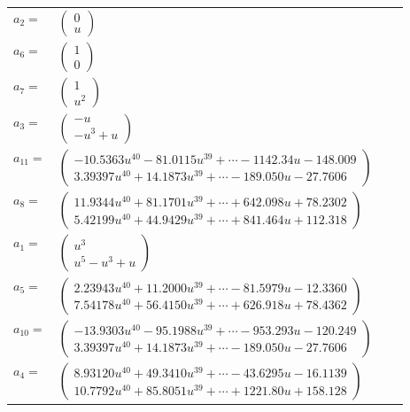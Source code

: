 \documentclass[1p]{elsarticle_modified}
\theoremstyle{definition}
\begin{document}
\begin{tabular}{m{7pt} m{180pt} m{7pt} m{180pt} }
\flushright $a_{2}=$&$\begin{pmatrix}0\\u\end{pmatrix}$ \\
\flushright $a_{6}=$&$\begin{pmatrix}1\\0\end{pmatrix}$ \\
\flushright $a_{7}=$&$\begin{pmatrix}1\\u^2\end{pmatrix}$ \\
\flushright $a_{3}=$&$\begin{pmatrix}- u\\- u^3+u\end{pmatrix}$ \\
\flushright $a_{11}=$&$\begin{pmatrix}-10.5363 u^{40}-81.0115 u^{39}+\cdots-1142.34 u-148.009\\3.39397 u^{40}+14.1873 u^{39}+\cdots-189.050 u-27.7606\end{pmatrix}$ \\
\flushright $a_{8}=$&$\begin{pmatrix}11.9344 u^{40}+81.1701 u^{39}+\cdots+642.098 u+78.2302\\5.42199 u^{40}+44.9429 u^{39}+\cdots+841.464 u+112.318\end{pmatrix}$ \\
\flushright $a_{1}=$&$\begin{pmatrix}u^3\\u^5- u^3+u\end{pmatrix}$ \\
\flushright $a_{5}=$&$\begin{pmatrix}2.23943 u^{40}+11.2000 u^{39}+\cdots-81.5979 u-12.3360\\7.54178 u^{40}+56.4150 u^{39}+\cdots+626.918 u+78.4362\end{pmatrix}$ \\
\flushright $a_{10}=$&$\begin{pmatrix}-13.9303 u^{40}-95.1988 u^{39}+\cdots-953.293 u-120.249\\3.39397 u^{40}+14.1873 u^{39}+\cdots-189.050 u-27.7606\end{pmatrix}$ \\
\flushright $a_{4}=$&$\begin{pmatrix}8.93120 u^{40}+49.3410 u^{39}+\cdots-43.6295 u-16.1139\\10.7792 u^{40}+85.8051 u^{39}+\cdots+1221.80 u+158.128\end{pmatrix}$ \\

\end{tabular}
\end{document}
